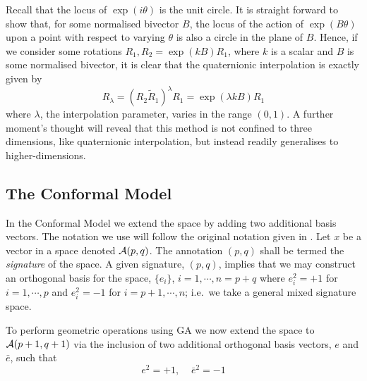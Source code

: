Recall that the locus of $\exp(i\theta)$ is the unit
circle. It is straight forward to show that, for some normalised
bivector $B$, the locus of the action of $\exp(B\theta)$ upon a point with respect to varying
$\theta$ is also a circle in the plane of $B$. Hence, if we consider
some rotations $R_1, R_2 = \exp(kB)R_1$, where $k$ is a scalar and
$B$ is some normalised bivector, it is clear that
the quaternionic interpolation is exactly given by
\[
R_\lambda = (R_2 \tilde{R}_1)^\lambda R_1 = \exp(\lambda kB) R_1
\]
where $\lambda$, the interpolation parameter, varies in the range $(0,1)$. A
further moment's thought will reveal that this method is not confined to three
dimensions, like quaternionic interpolation, but instead readily generalises
to higher-dimensions.

\subsection{The Conformal Model}

In the Conformal Model\cite{GA:NFCM} we extend the space by adding two
additional basis vectors. The notation we use will follow the original
notation given in \cite{HS84}. Let $x$ be a vector in a space denoted
${\mathcal{A}}(p,q)$.  The annotation $(p,q)$ shall be termed the \emph{signature}
of the space.  A given signature, $(p,q)$, implies that we may construct an
orthogonal basis for the space, $\{e_i\}$, $i=1,\cdots,n=p+q$ where $e_i^2=+1$
for $i=1,\cdots,p$ and $e_i^2=-1$ for $i=p+1,\cdots,n$; i.e.\ we take a
general mixed signature space.  

To perform geometric operations using GA we now extend the space 
to ${\mathcal{A}}(p+1,q+1)$ via the inclusion of two additional orthogonal
basis  vectors, $e$ and
$\bar{e}$, such that
%
\[  e^2=+1,\;\;\;\; \bar{e}^2= -1
\]
%

